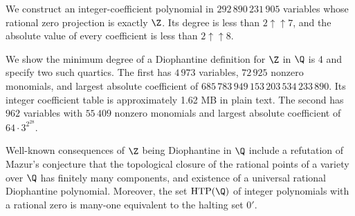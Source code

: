 We construct an integer-coefficient polynomial in
$292\,890\,231\,905$ variables whose rational zero projection is exactly
$\Z$. Its degree is less than $2\mathbin{\uparrow\!\uparrow}7$, and the
absolute value of every coefficient is less than
$2\mathbin{\uparrow\!\uparrow}8$.

We show the minimum degree of a Diophantine definition for $\Z$ in $\Q$ is 4 and specify two such quartics. The first has $4\,973$ variables, $72\,925$ nonzero monomials, and largest absolute coefficient of $685\,783\,949\,153\,203\,534\,233\,890$. Its integer coefficient table is approximately 1.62 MB in plain text. The second has $962$ variables with $55\,409$ nonzero monomials and largest absolute coefficient of $64\cdot 3^{2^{28}}$.

Well-known consequences of $\Z$ being Diophantine in $\Q$ include a refutation of Mazur's conjecture that the topological closure of the rational points of a variety over $\Q$ has finitely many components, and existence of a universal rational Diophantine polynomial. Moreover, the set $\operatorname{HTP}(\Q)$ of integer polynomials with a rational zero is many-one equivalent to the halting set $0'$.
